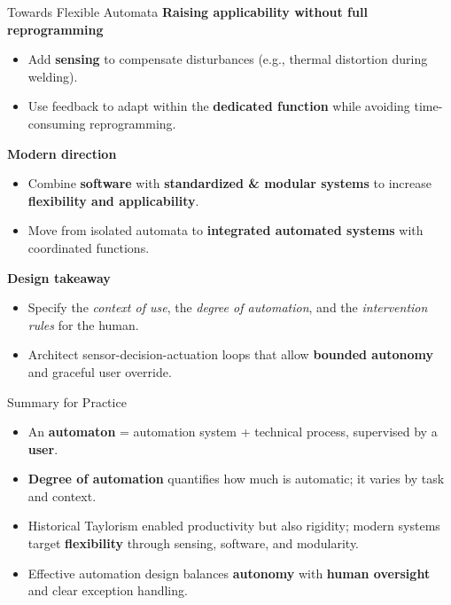 \begin{frame}{Towards Flexible Automata}
\textbf{Raising applicability without full reprogramming}
\begin{itemize}
  \item Add \textbf{sensing} to compensate disturbances (e.g., thermal distortion during welding).
  \item Use feedback to adapt within the \textbf{dedicated function} while avoiding time-consuming reprogramming.
\end{itemize}

\vspace{2mm}
\textbf{Modern direction}
\begin{itemize}
  \item Combine \textbf{software} with \textbf{standardized \& modular systems} to increase \textbf{flexibility and applicability}.
  \item Move from isolated automata to \textbf{integrated automated systems} with coordinated functions.
\end{itemize}

\vspace{2mm}
\textbf{Design takeaway}
\begin{itemize}
  \item Specify the \emph{context of use}, the \emph{degree of automation}, and the \emph{intervention rules} for the human.
  \item Architect sensor-decision-actuation loops that allow \textbf{bounded autonomy} and graceful user override.
\end{itemize}
\end{frame}

\begin{frame}{Summary for Practice}
\begin{itemize}
  \item An \textbf{automaton} = automation system + technical process, supervised by a \textbf{user}.
  \item \textbf{Degree of automation} quantifies how much is automatic; it varies by task and context.
  \item Historical Taylorism enabled productivity but also rigidity; modern systems target \textbf{flexibility} through sensing, software, and modularity.
  \item Effective automation design balances \textbf{autonomy} with \textbf{human oversight} and clear exception handling.
\end{itemize}
\end{frame}

